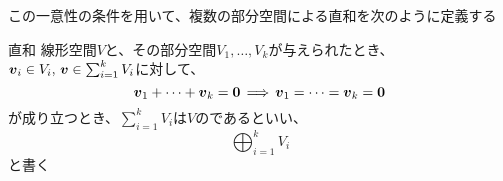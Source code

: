 \documentclass[../../../topic_linear-algebra]{subfiles}
\begin{document}
\br

この一意性の条件を用いて、複数の部分空間による直和を次のように定義する

\begin{definition}{直和}
  線形空間$V$と、その部分空間$V_1,\ldots,V_k$が与えられたとき、$\vb*{v}_i \in V_i,\,\vb*{v} \in \sum_{i=1}^k V_i$に対して、
  \begin{equation*}
    \vb*{v}_1 + \cdots + \vb*{v}_k = \vb*{0} \, \Longrightarrow \, \vb*{v}_1 = \cdots = \vb*{v}_k = \vb*{0}
  \end{equation*}
  が成り立つとき、$\displaystyle\sum_{i=1}^{k} V_i$は$V$のであるといい、
  \begin{equation*}
    \bigoplus_{i=1}^k V_i
  \end{equation*}
  と書く
\end{definition}
\end{document}
